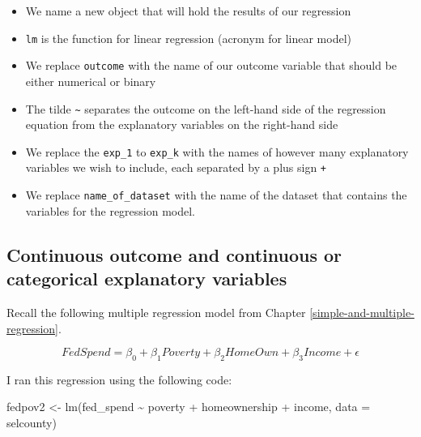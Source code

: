 \documentclass[
]{book}
\makeatletter
\newenvironment{Shaded}{\begin{snugshade}}{\end{snugshade}}
\newcommand{\AttributeTok}[1]{\textcolor[rgb]{0.61,0.61,0.61}{#1}}
\newcommand{\FunctionTok}[1]{\textcolor[rgb]{0,0,0}{#1}}
\newcommand{\NormalTok}[1]{#1}
\newcommand{\OtherTok}[1]{\textcolor[rgb]{0.37,0.37,0.37}{#1}}
\newcommand{\SpecialCharTok}[1]{\textcolor[rgb]{0,0,0}{#1}}
\providecommand{\tightlist}{%
  \setlength{\itemsep}{0pt}\setlength{\parskip}{0pt}}
\newenvironment{kframe}{%
\medskip{}
\setlength{\fboxsep}{.8em}
 \def\at@end@of@kframe{}%
 \ifinner\ifhmode%
  \def\at@end@of@kframe{\end{minipage}}%
  \begin{minipage}{\columnwidth}%
 \fi\fi%
 \def\FrameCommand##1{\hskip\@totalleftmargin \hskip-\fboxsep
 \colorbox{shadecolor}{##1}\hskip-\fboxsep
     \hskip-\linewidth \hskip-\@totalleftmargin \hskip\columnwidth}%
 \MakeFramed {\advance\hsize-\width
   \@totalleftmargin\z@ \linewidth\hsize
   \@setminipage}}%
 {\par\unskip\endMakeFramed%
 \at@end@of@kframe}
\renewenvironment{Shaded}{\begin{kframe}}{\end{kframe}}
\makeatother
\begin{document}
\begin{itemize}
\tightlist
\item
  We name a new object that will hold the results of our regression
\item
  \texttt{lm} is the function for linear regression (acronym for linear model)
\item
  We replace \texttt{outcome} with the name of our outcome variable that should be either numerical or binary
\item
  The tilde \texttt{\textasciitilde{}} separates the outcome on the left-hand side of the regression equation from the explanatory variables on the right-hand side
\item
  We replace the \texttt{exp\_1} to \texttt{exp\_k} with the names of however many explanatory variables we wish to include, each separated by a plus sign \texttt{+}
\item
  We replace \texttt{name\_of\_dataset} with the name of the dataset that contains the variables for the regression model.
\end{itemize}

\hypertarget{continuous-outcome-and-continuous-or-categorical-explanatory-variables}{%
\subsection{Continuous outcome and continuous or categorical explanatory variables}\label{continuous-outcome-and-continuous-or-categorical-explanatory-variables}}

Recall the following multiple regression model from Chapter \ref{simple-and-multiple-regression}.

\begin{equation}
FedSpend = \beta_0 + \beta_1Poverty + \beta_2HomeOwn + \beta_3Income + \epsilon
\label{eq:multregexrep}
\end{equation}

I ran this regression using the following code:

\begin{Shaded}
\begin{Highlighting}[]
\NormalTok{fedpov2 }\OtherTok{\textless{}{-}} \FunctionTok{lm}\NormalTok{(fed\_spend }\SpecialCharTok{\textasciitilde{}}\NormalTok{ poverty }\SpecialCharTok{+}\NormalTok{ homeownership }\SpecialCharTok{+}\NormalTok{ income, }\AttributeTok{data =}\NormalTok{ selcounty)}
\end{Highlighting}
\end{Shaded}
\end{document}
